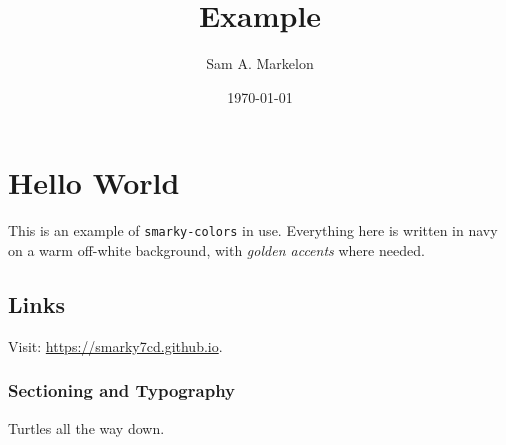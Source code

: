 \documentclass{article}
\title{\color{gold} Example} %
\author{Sam A. Markelon}
\date{\today}
\begin{document}
\maketitle

\section{Hello World}
This is an example of \texttt{smarky-colors} in use. Everything here is written in navy on a warm off-white background, with \emph{golden accents} where needed.

\subsection{Links}

Visit: \url{https://smarky7cd.github.io}. 

\subsubsection{Sectioning and Typography}

Turtles all the way down. 
\end{document}
